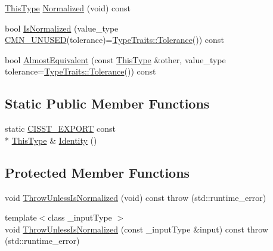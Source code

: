 \begin{DoxyCompactItemize}
\item 
\hyperlink{classvct_rodriguez_rotation3_base_add2bccab7f6e86c98b3f97fd00b06dcc}{This\-Type} \hyperlink{classvct_rodriguez_rotation3_base_a6cbaef874949eaabe462045532a3783a}{Normalized} (void) const 
\item 
bool \hyperlink{classvct_rodriguez_rotation3_base_a0a97d695e97f438a230b3e78762391e0}{Is\-Normalized} (value\-\_\-type \hyperlink{cmn_portability_8h_a021894e2626935fa2305434b1e893ff6}{C\-M\-N\-\_\-\-U\-N\-U\-S\-E\-D}(tolerance)=\hyperlink{classcmn_type_traits_adc129bf9867295b90d300768b780fa99}{Type\-Traits\-::\-Tolerance}()) const 
\item 
bool \hyperlink{classvct_rodriguez_rotation3_base_abeb345b269ff6f09eac03cb96217f9a3}{Almost\-Equivalent} (const \hyperlink{classvct_rodriguez_rotation3_base_add2bccab7f6e86c98b3f97fd00b06dcc}{This\-Type} \&other, value\-\_\-type tolerance=\hyperlink{classcmn_type_traits_adc129bf9867295b90d300768b780fa99}{Type\-Traits\-::\-Tolerance}()) const 
\end{DoxyCompactItemize}
\subsection*{Static Public Member Functions}
\begin{DoxyCompactItemize}
\item 
static \hyperlink{cmn_export_macros_8h_a99393e0c3ac434b2605235bbe20684f8}{C\-I\-S\-S\-T\-\_\-\-E\-X\-P\-O\-R\-T} const \\*
\hyperlink{classvct_rodriguez_rotation3_base_add2bccab7f6e86c98b3f97fd00b06dcc}{This\-Type} \& \hyperlink{classvct_rodriguez_rotation3_base_af2b3ccba71788c52e9ade4033f1e61dc}{Identity} ()
\end{DoxyCompactItemize}
\subsection*{Protected Member Functions}
\begin{DoxyCompactItemize}
\item 
void \hyperlink{classvct_rodriguez_rotation3_base_a404f78e0162eaa6261bbf29e55e0e6ca}{Throw\-Unless\-Is\-Normalized} (void) const   throw (std\-::runtime\-\_\-error)
\item 
{\footnotesize template$<$class \-\_\-input\-Type $>$ }\\void \hyperlink{classvct_rodriguez_rotation3_base_acde5653d43f7c1c8c2fd83f3fd108079}{Throw\-Unless\-Is\-Normalized} (const \-\_\-input\-Type \&input) const   throw (std\-::runtime\-\_\-error)
\end{DoxyCompactItemize}


